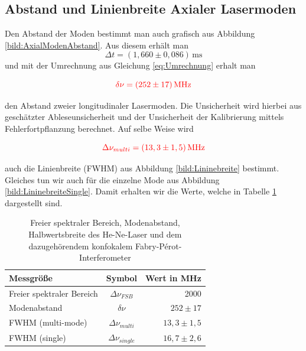 \subsection*{Abstand und Linienbreite Axialer Lasermoden}

Den Abstand der Moden bestimmt man auch grafisch aus Abbildung \ref{bild:AxialModenAbstand}. Aus diesem erhält man 
\begin{equation*}
    \Delta t = (1,660 \pm 0,086)\,\mathrm{ms}
\end{equation*}
und mit der Umrechnung aus Gleichung \ref{eq:Umrechnung} erhalt man 

\begin{equation}
    \textcolor{red}{\delta \nu = (252 \pm 17)\,\mathrm{MHz}}
    \label{eq:Modenabstand}
\end{equation}

den Abstand zweier longitudinaler Lasermoden. Die Unsicherheit wird hierbei aus geschätzter Ableseunsicherheit und
der Unsicherheit der Kalibrierung mittels Fehlerfortpflanzung berechnet. Auf selbe Weise wird 

\begin{equation}
    \textcolor{red}{\Delta \nu_{multi} = (13,3 \pm 1,5)\,\mathrm{MHz}}
\end{equation}

auch die Linienbreite (FWHM) aus Abbildung \ref{bild:Lininebreite} bestimmt. Gleiches tun wir auch für die einzelne Mode
aus Abbildung \ref{bild:LininebreiteSingle}. Damit erhalten wir die Werte, welche in Tabelle \ref{tab:Linienbreite} dargestellt sind.

\begin{table}[ht]
    \centering
 
    \begin{tabular}{lcr}
        \toprule
        Messgröße & Symbol & Wert in MHz\\
        \midrule
        Freier spektraler Bereich& $\Delta \nu_{FSB}$ & 2000\\
        Modenabstand& $\delta\nu$& $252 \pm 17$\\
        FWHM (multi-mode)& $\Delta\nu_{multi}$&$13,3 \pm 1,5$\\
        FWHM (single)& $\Delta\nu_{single}$&$16,7 \pm 2,6$\\
        \bottomrule        
    \end{tabular}
  
    \caption{Freier spektraler Bereich, Modenabstand, Halbwertsbreite des He-Ne-Laser und dem dazugehörendem 
    konfokalem Fabry-Pérot-Interferometer}
    \label{tab:Linienbreite}
\end{table}

